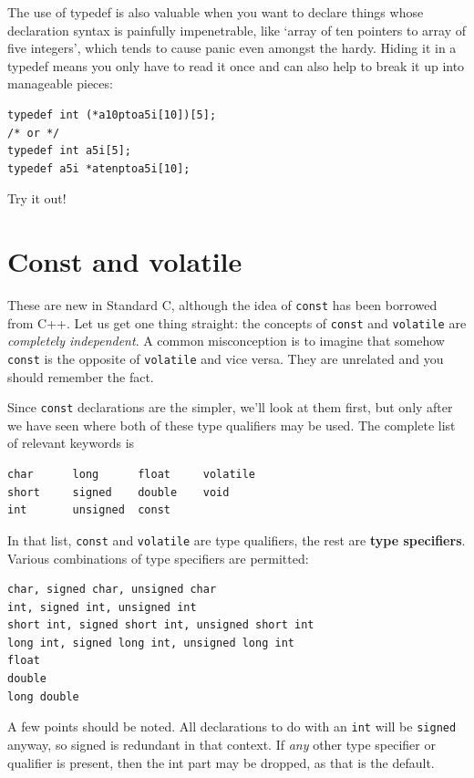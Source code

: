   The use of typedef is also valuable when you want to declare things
   whose declaration syntax is painfully impenetrable, like `array of ten
   pointers to array of five integers', which tends to cause panic even
   amongst the hardy. Hiding it in a typedef means you only have to read it
   once and can also help to break it up into manageable pieces:


\begin{Verbatim}
typedef int (*a10ptoa5i[10])[5];
/* or */
typedef int a5i[5];
typedef a5i *atenptoa5i[10];
\end{Verbatim}

  Try it out!


 
        \section{Const and volatile}
        

  

  These are new in Standard C, although the idea of \texttt{const}
   has been borrowed from C++. Let us get one thing straight: the concepts
   of \texttt{const} and \texttt{volatile} are \textit{completely
   independent}. A common misconception is to imagine that somehow
   \texttt{const} is the opposite of \texttt{volatile} and vice
   versa. They are unrelated and you should remember the fact.


  Since \texttt{const} declarations are the simpler, we'll look at
   them first, but only after we have seen where both of these type
   qualifiers may be used. The complete list of relevant keywords is


\begin{Verbatim}
char      long      float     volatile
short     signed    double    void
int       unsigned  const
\end{Verbatim}

  In that list, \texttt{const} and \texttt{volatile} are type
   qualifiers, the rest are \textbf{type specifiers}. Various combinations
   of type specifiers are permitted:


\begin{Verbatim}
char, signed char, unsigned char
int, signed int, unsigned int
short int, signed short int, unsigned short int
long int, signed long int, unsigned long int
float
double
long double
\end{Verbatim}

  A few points should be noted. All declarations to do with an
   \texttt{int} will be \texttt{signed} anyway, so signed is
   redundant in that context. If \textit{any} other type specifier or
   qualifier is present, then the int part may be dropped, as that is the
   default.


